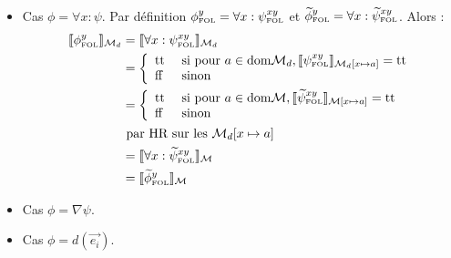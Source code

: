 \documentclass[12pt]{article}
\newcommand{\FOL}{\ensuremath{\textup{\tiny{}FOL}}}
\newcommand{\false}{\textup{ff}}
\newcommand{\true}{\textup{tt}}
\newcommand{\M}{\ensuremath{\mathcal{M}}}
\newcommand{\bpar}[1]{\marginpar{\color{myblue}\footnotesize\raggedright#1}}
\begin{document}
\begin{itemize}
\item
  Cas $\phi = \forall x : \psi$.
  Par définition $\phi_\FOL^y = \forall x : {\psi}_\FOL^{xy}$ et $\widetilde{\phi}_\FOL^y = \forall x : \widetilde{\psi}_\FOL^{xy}$.
  Alors :
  \begin{align*}
    \llbracket \phi_\FOL^y \rrbracket_{\mathcal{M}_d}
    &= \llbracket \forall x : \psi_\FOL^{xy} \rrbracket_{\mathcal{M}_d} \\
    &= \left \{
      \begin{array}{l l}
        \true & \textup{ si pour } a \in \textup{dom} \mathcal{M}_d, \llbracket \psi_\FOL^{xy} \rrbracket_{\mathcal{M}_d[x \mapsto a]} = \true \\
        \false & \textup{ sinon }
      \end{array}
                 \right . \\
    &= \left \{
      \begin{array}{l l}
        \true & \textup{ si pour } a \in \textup{dom} \mathcal{M}, \llbracket \widetilde{\psi}_\FOL^{xy} \rrbracket_{\mathcal{M}[x \mapsto a]} = \true \\
        \false & \textup{ sinon }
      \end{array}
                 \right . \\
    & \textup{ par HR sur les } \M_d[x \mapsto a] \\
    &= \llbracket \forall x : \widetilde{\psi}_\FOL^{xy} \rrbracket_{\mathcal{M}} \\
    &= \llbracket \widetilde{\phi}_\FOL^y \rrbracket_{\mathcal{M}}
  \end{align*}
\item
  Cas $\phi = \nabla \psi$.
\item
  Cas $\phi = d(\vec{e_i})$.
\end{itemize}
\end{document}
